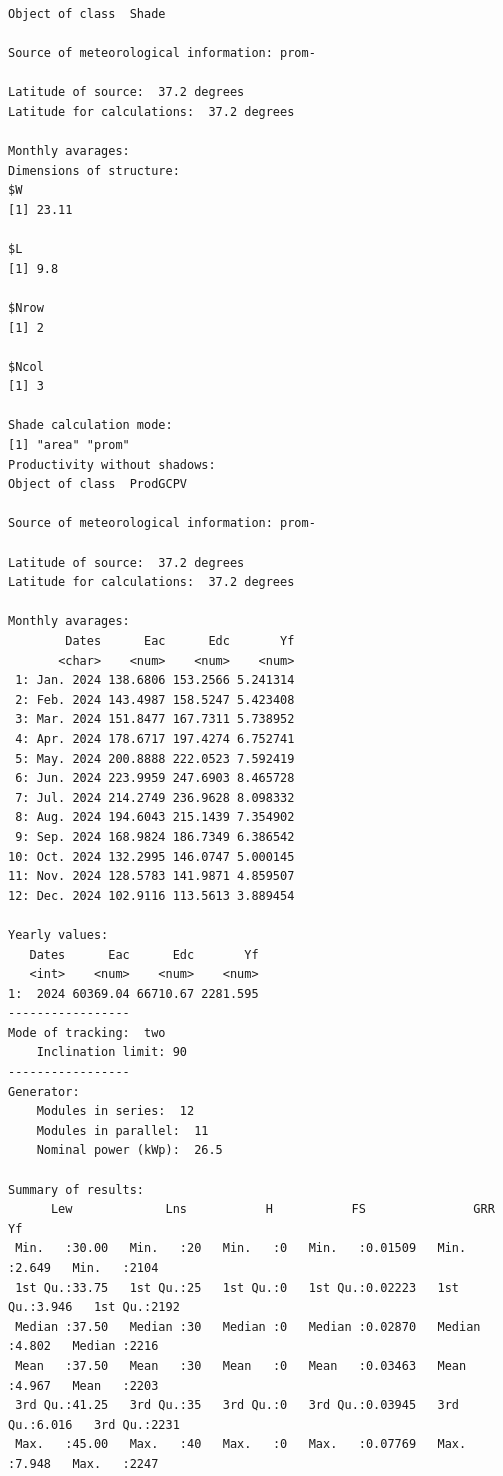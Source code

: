 \begin{verbatim}
Object of class  Shade 

Source of meteorological information: prom- 

Latitude of source:  37.2 degrees
Latitude for calculations:  37.2 degrees

Monthly avarages:
Dimensions of structure:
$W
[1] 23.11

$L
[1] 9.8

$Nrow
[1] 2

$Ncol
[1] 3

Shade calculation mode:
[1] "area" "prom"
Productivity without shadows:
Object of class  ProdGCPV 

Source of meteorological information: prom- 

Latitude of source:  37.2 degrees
Latitude for calculations:  37.2 degrees

Monthly avarages:
        Dates      Eac      Edc       Yf
       <char>    <num>    <num>    <num>
 1: Jan. 2024 138.6806 153.2566 5.241314
 2: Feb. 2024 143.4987 158.5247 5.423408
 3: Mar. 2024 151.8477 167.7311 5.738952
 4: Apr. 2024 178.6717 197.4274 6.752741
 5: May. 2024 200.8888 222.0523 7.592419
 6: Jun. 2024 223.9959 247.6903 8.465728
 7: Jul. 2024 214.2749 236.9628 8.098332
 8: Aug. 2024 194.6043 215.1439 7.354902
 9: Sep. 2024 168.9824 186.7349 6.386542
10: Oct. 2024 132.2995 146.0747 5.000145
11: Nov. 2024 128.5783 141.9871 4.859507
12: Dec. 2024 102.9116 113.5613 3.889454

Yearly values:
   Dates      Eac      Edc       Yf
   <int>    <num>    <num>    <num>
1:  2024 60369.04 66710.67 2281.595
-----------------
Mode of tracking:  two 
    Inclination limit: 90 
-----------------
Generator:
    Modules in series:  12 
    Modules in parallel:  11 
    Nominal power (kWp):  26.5 

Summary of results:
      Lew             Lns           H           FS               GRR              Yf      
 Min.   :30.00   Min.   :20   Min.   :0   Min.   :0.01509   Min.   :2.649   Min.   :2104  
 1st Qu.:33.75   1st Qu.:25   1st Qu.:0   1st Qu.:0.02223   1st Qu.:3.946   1st Qu.:2192  
 Median :37.50   Median :30   Median :0   Median :0.02870   Median :4.802   Median :2216  
 Mean   :37.50   Mean   :30   Mean   :0   Mean   :0.03463   Mean   :4.967   Mean   :2203  
 3rd Qu.:41.25   3rd Qu.:35   3rd Qu.:0   3rd Qu.:0.03945   3rd Qu.:6.016   3rd Qu.:2231  
 Max.   :45.00   Max.   :40   Max.   :0   Max.   :0.07769   Max.   :7.948   Max.   :2247
\end{verbatim}

